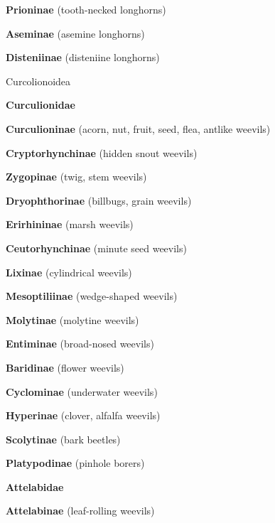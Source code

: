 \documentclass[letterpaper,10pt]{article}
\begin{document}
{\makebox[0.8cm]{}  \textbf{Prioninae} (tooth-necked longhorns) \par
\makebox[0.8cm]{}  \textbf{Aseminae} (asemine longhorns) \par
\makebox[0.8cm]{}  \textbf{Disteniinae} (disteniine longhorns) \par
\makebox[0.40cm]{}  Curcolionoidea \par
\makebox[0.6cm]{}  \textbf{Curculionidae} \par
\makebox[0.8cm]{}  \textbf{Curculioninae} (acorn, nut, fruit, seed, flea, antlike weevils) \par
\makebox[0.8cm]{}  \textbf{Cryptorhynchinae} (hidden snout weevils) \par
\makebox[0.8cm]{}  \textbf{Zygopinae} (twig, stem weevils) \par
\makebox[0.8cm]{}  \textbf{Dryophthorinae} (billbugs, grain weevils) \par
\makebox[0.8cm]{}  \textbf{Erirhininae} (marsh weevils) \par
\makebox[0.8cm]{}  \textbf{Ceutorhynchinae} (minute seed weevils) \par
\makebox[0.8cm]{}  \textbf{Lixinae} (cylindrical weevils) \par
\makebox[0.8cm]{}  \textbf{Mesoptiliinae} (wedge-shaped weevils) \par
\makebox[0.8cm]{}  \textbf{Molytinae} (molytine weevils) \par
\makebox[0.8cm]{}  \textbf{Entiminae} (broad-nosed weevils) \par
\makebox[0.8cm]{}  \textbf{Baridinae} (flower weevils) \par
\makebox[0.8cm]{}  \textbf{Cyclominae} (underwater weevils) \par
\makebox[0.8cm]{}  \textbf{Hyperinae} (clover, alfalfa weevils) \par
\makebox[0.8cm]{}  \textbf{Scolytinae} (bark beetles) \par
\makebox[0.8cm]{}  \textbf{Platypodinae} (pinhole borers) \par
\makebox[0.6cm]{}  \textbf{Attelabidae} \par
\makebox[0.8cm]{}  \textbf{Attelabinae} (leaf-rolling weevils) \par
}
\end{document}
